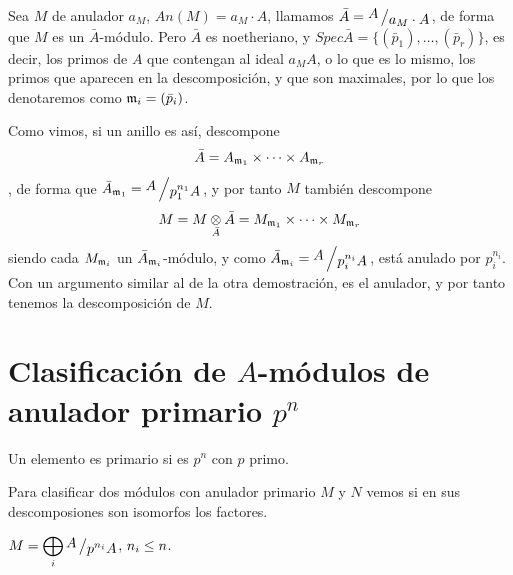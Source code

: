 \begin{dem}
    [2] Sea $M$ de anulador $a_M$, $An(M) = a_M \cdot A$, llamamos $\bar A = \modulo{A}{a_M \cdot A}$, de forma que $M$ es un $\bar A$-m\'odulo. Pero $\bar A$ es noetheriano, y $Spec \bar A = \{(\bar p_1), \ldots, (\bar p_r)\}$, es decir, los primos de $A$ que contengan al ideal $a_M A$, o lo que es lo mismo, los primos que aparecen en la descomposici\'on, y que son maximales, por lo que los denotaremos como $\mathfrak{m}_i = (\bar p_i)$.
    
    Como vimos, si un anillo es as\'i, descompone $$\bar A = A_{\mathfrak{m}_1} \times \cdots \times A_{\mathfrak{m}_r}$$, de forma que $\bar A_{\m_1} = \modulo{A}{p_1^{n_1} A}$, y por tanto $M$ tambi\'en descompone 
    $$M = M \underset{\bar A}{\otimes} \bar A = M_{\mathfrak{m}_1} \times \cdots \times M_{\mathfrak{m}_r}$$
    siendo cada $M_{\mathfrak{m}_i}$ un $\bar A_{\mathfrak{m}_i}$-m\'odulo, y como $\bar A_{\m_i} = \modulo{A}{p_i^{n_i} A}$, est\'a anulado por $p_i^{n_i}$. Con un argumento similar al de la otra demostraci\'on, es el anulador, y por tanto tenemos la descomposición de $M$. 
\end{dem}
\section{Clasificaci\'on de $A$-m\'odulos de anulador primario $p^n$}
Un elemento es primario si es $p^n$ con $p$ primo.

Para clasificar dos m\'odulos con anulador primario $M$ y $N$ vemos si en sus descomposiones son isomorfos los factores.

\begin{teo}
    $\displaystyle M = \bigoplus_i \modulo{A}{p^{n_i} A}, \, n_i\leq n$. 
\end{teo}

